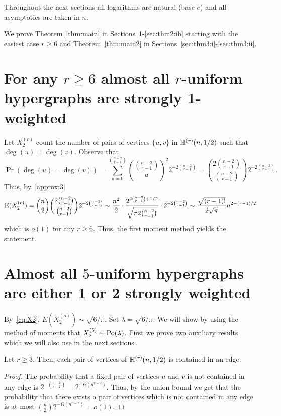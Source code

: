 \documentclass[12pt,reqno]{amsart}
\begin{document}
Throughout the next sections all logarithms are natural (base $e$) and all asymptotics are taken in $n$. 

We prove Theorem~\ref{thm:main} in Sections~\ref{sec:thm2:iii}-\ref{sec:thm2:ib} starting with the easiest case $r\ge 6$ and Theorem~\ref{thm:main2} in Sections~\ref{sec:thm3:i}-\ref{sec:thm3:ii}.

\section{For any $r\ge 6$ almost all $r$-uniform hypergraphs are strongly 1-weighted}\label{sec:thm2:iii}

Let $X_{2}^{(r)}$ count the number of pairs of vertices $\{u,v\}$ in $\mathbb{H}^{({r})}(n,1/2)$ such that $\deg(u)=\deg(v)$. Observe that
\[
\Pr(\deg(u)=\deg(v)) = \sum_{a=0}^{\binom{n-2}{r-1}}  \binom{\binom{n-2}{r-1}}{a}^2 2^{-2\binom{n-2}{r-1}}
= \binom{2\binom{n-2}{r-1}}{\binom{n-2}{r-1}} 2^{-2\binom{n-2}{r-1}}.
\]
Thus, by~\ref{approx:3} 
\begin{equation}\label{eq:X2}
\mathrm{E}(X_2^{(r)}) = \binom{n}{2} \binom{2\binom{n-2}{r-1}}{\binom{n-2}{r-1}} 2^{-2\binom{n-2}{r-1}} 
\sim \frac{n^2}{2} \cdot \frac{2^{2\binom{n-2}{r-1}+1/2}}{\sqrt{\pi 2\binom{n-2}{r-1}}} \cdot 2^{-2\binom{n-2}{r-1}}
\sim \frac{\sqrt{(r-1)!}}{2\sqrt{\pi}} n^{2-(r-1)/2} 
\end{equation}
which is $o(1)$ for any $r\ge 6$. Thus, the first moment method yields the statement.

\section{Almost all $5$-uniform hypergraphs are either 1 or 2 strongly weighted}\label{sec:thm2:ii}

By~\eqref{eq:X2}, $E(X_2^{(5)}) \sim \sqrt{6/\pi}$. Set $\lambda=\sqrt{6/\pi}$.
We will show by using the method of moments that $X_2^{(5)} \sim \textrm{Po}(\lambda)$. First we prove two auxiliary results which we will also use in the next sections.

\begin{lemma}\label{lem:2}
Let $r\ge 3$. Then, \whp each pair of vertices of $\mathbb{H}^{({r})}(n,1/2)$ is contained in an edge.
\end{lemma}
\begin{proof} 
The probability that a fixed pair of vertices $u$ and $v$ is not contained in any edge is $2^{-\binom{n-2}{r-2}}= 2^{-\Omega(n^{r-2})}$. Thus, by the union bound we get that the probability that there exists a pair of vertices which is not contained in any edge is  at most $\binom{n}{2} 2^{-\Omega(n^{r-2})} = o(1)$.
\end{proof}
\end{document}
